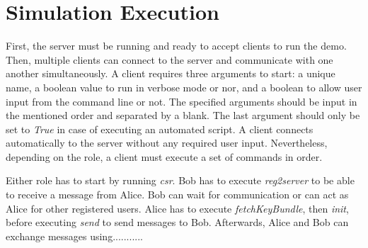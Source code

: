 \section{Simulation Execution}
First, the server must be running and ready to accept clients to run the demo. Then, multiple clients can connect to the server and communicate with one another simultaneously. A client requires three arguments to start: a unique name, a boolean value to run in verbose mode or nor, and a boolean to allow user input from the command line or not. The specified arguments should be input in the mentioned order and separated by a blank. The last argument should only be set to \textit{True} in case of executing an automated script. A client connects automatically to the server without any required user input. Nevertheless, depending on the role, a client must execute a set of commands in order.
\par
Either role has to start by running \textit{csr}. Bob has to execute \textit{reg2server} to be able to receive a message from Alice. Bob can wait for communication or can act as Alice for other registered users. Alice has to execute \textit{fetchKeyBundle}, then \textit{init}, before executing \textit{send} to send messages to Bob. Afterwards, Alice and Bob can exchange messages using...........

